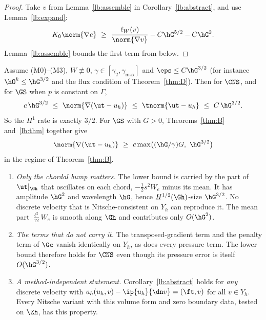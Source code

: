 \begin{proof}
Take $v$ from Lemma~\ref{lb:assemble} in Corollary~\ref{lb:abstract}, and use Lemma~\ref{lb:expand}:
\[
K_0\norm{\nabla e}\ \ge\ \frac{\ell_W(v)}{\norm{\nabla v}}-C\hG^{5/2}-C\hG^2 .
\]
Lemma~\ref{lb:assemble} bounds the first term from below.
\end{proof}

\begin{corollary}[Sharpness of Theorem~\ref{thm:D} and of Theorem~\ref{thm:A} at $G=0$]\label{lb:cor}
Assume (M0)--(M3), $W\not\equiv0$, $\gamma\in[\gamma_2,\gamma_{\max}]$ and $\eps\le C\hG^{3/2}$ (for instance $\hO^k\le\hG^{3/2}$ and the flux condition of Theorem~\ref{thm:D}). Then for $\CNS$, and for $\GS$ when $p$ is constant on $\Gamma$,
\[
c\,\hG^{3/2}\ \le\ \norm{\nabla(\ut-u_h)}\ \le\ \tnorm{\ut-u_h}\ \le\ C\,\hG^{3/2}.
\]
So the $H^1$ rate is exactly $3/2$. For $\GS$ with $G>0$, Theorems~\ref{thm:B} and~\ref{lb:thm} together give
\[
\norm{\nabla(\ut-u_h)}\ \ge\ c\max\bigl((\hG/\gamma)G,\ \hG^{3/2}\bigr)
\]
in the regime of Theorem~\ref{thm:B}.
\end{corollary}

\begin{remark}
\begin{enumerate}
\item \emph{Only the chordal bump matters.} The lower bound is carried by the part of $\ut|_{\Gh}$ that oscillates on each chord, $-\frac12s^2W_e$ minus its mean. It has amplitude $\hG^2$ and wavelength $\hG$, hence $H^{1/2}(\Gh)$-size $\hG^{3/2}$. No discrete velocity that is Nitsche-consistent on $Y_h$ can reproduce it. The mean part $\frac{\ell^2}{12}W_e$ is smooth along $\Gh$ and contributes only $O(\hG^2)$.
\item \emph{The terms that do not carry it.} The transposed-gradient term and the penalty term of $\Gc$ vanish identically on $Y_h$, as does every pressure term. The lower bound therefore holds for $\CNS$ even though its pressure error is itself $O(\hG^{3/2})$.
\item \emph{A method-independent statement.} Corollary~\ref{lb:abstract} holds for \emph{any} discrete velocity with $a_h(u_h,v)-\ip{u_h}{\dn v}=(\ft,v)$ for all $v\in Y_h$. Every Nitsche variant with this volume form and zero boundary data, tested on $\Zh$, has this property.
\end{enumerate}
\end{remark}

